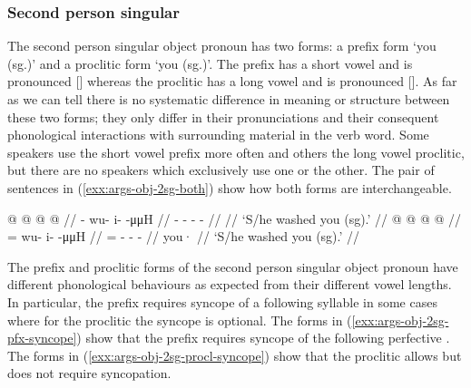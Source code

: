 
\subsubsection{Second person singular}\label{sec:args-obj-2sg}

The second person singular object pronoun has two forms: a prefix form  ‘you (sg.)’ and a proclitic form  ‘you (sg.)’.
The prefix  has a short vowel and is pronounced [] whereas the proclitic  has a long vowel and is pronounced [].
As far as we can tell there is no systematic difference in meaning or structure between these two forms; they only differ in their pronunciations and their consequent phonological interactions with surrounding material in the verb word.
Some speakers use the short vowel prefix more often and others the long vowel proclitic, but there are no speakers which exclusively use one or the other.
The pair of sentences in (\ref{exx:args-obj-2sg-both}) show how both forms are interchangeable.

\pex\label{exx:args-obj-2sg-both}%
\a\label{exx:args-obj-2sg-both-prefix}%
%
\begingl
	\gla	{} @ {} @ {} @ {} @ {} //
	\glb	{}- wu- i-  -μμH //
	\glc	{}- - -  - //
	\gld	{} {} {} {} {} //
	\glft	‘S/he washed you (sg).’
		//
\endgl
\a\label{exx:args-obj-2sg-both-proclitic}%
%
\begingl
	\gla	{} @  @ {} @ {} @ {} //
	\glb	{}= wu- i-  -μμH //
	\glc	{}= - -  - //
	\gld	you·  {} {} {} //
	\glft	‘S/he washed you (sg).’
		//
\endgl
\xe

The prefix and proclitic forms of the second person singular object pronoun have different phonological behaviours as expected from their different vowel lengths.
In particular, the prefix requires syncope of a following syllable in some cases where for the proclitic the syncope is optional.
The forms in (\ref{exx:args-obj-2sg-pfx-syncope}) show that the prefix  requires syncope of the following perfective .
The forms in (\ref{exx:args-obj-2sg-procl-syncope}) show that the proclitic  allows but does not require syncopation.

